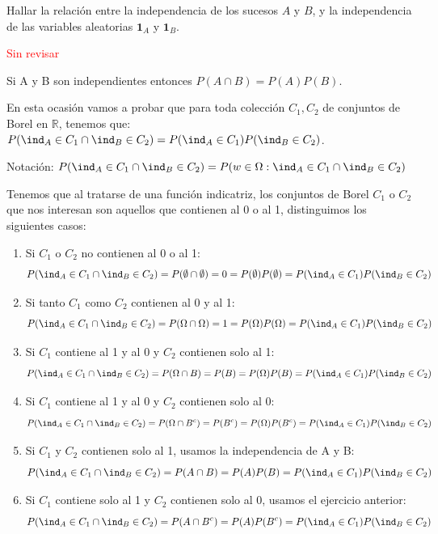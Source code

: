 \begin{problem}[2] Hallar la relaci\'on entre la independencia de los sucesos $A$ y $B$, y la independencia de las variables aleatorias $\mathbf{1}_A$ y $\mathbf{1}_B$.

\solution

\textcolor{red}{Sin revisar}

Si A y B son independientes entonces $P(A \cap B) = P(A)P(B)$.

En esta ocasión vamos a probar que para toda colección $C_1,C_2$ de conjuntos de Borel en $\mathbb{R}$, tenemos que: $P(\ind_A \in C_1 \cap \ind_B \in C_2)=P(\ind_A \in C_1)P(\ind_B \in C_2)$. 

Notación: $P(\ind_A \in C_1 \cap \ind_B \in C_2) = P(w \in \Omega : \ind_A \in C_1 \cap \ind_B \in C_2)$

Tenemos que al tratarse de una función indicatriz, los conjuntos de Borel $C_1$ o $C_2$ que nos interesan son aquellos que contienen al 0 o al 1, distinguimos los siguientes casos:

\begin{enumerate}
\item Si $C_1$ o $C_2$ no contienen al 0 o al 1:
\[
P(\ind_A \in C_1 \cap \ind_B \in C_2) = P(\emptyset \cap \emptyset) = 0 = P(\emptyset) P(\emptyset) =P(\ind_A \in C_1)P(\ind_B \in C_2)
\]

\item Si tanto $C_1$ como $C_2$ contienen al 0 y al 1:
\[
P(\ind_A \in C_1 \cap \ind_B \in C_2) = P(\Omega \cap \Omega) = 1 = P(\Omega) P(\Omega) = P(\ind_A \in C_1)P(\ind_B \in C_2)
\]

\item Si $C_1$ contiene al 1 y al 0 y $C_2$ contienen solo al 1:
\[
P(\ind_A \in C_1 \cap \ind_B \in C_2) = P(\Omega \cap B) = P(B) = P(\Omega) P(B) = P(\ind_A \in C_1)P(\ind_B \in C_2)
\]


\item Si $C_1$ contiene al 1 y al 0 y $C_2$ contienen solo al 0:
\[
P(\ind_A \in C_1 \cap \ind_B \in C_2) = P(\Omega \cap B^c) = P(B^c) = P(\Omega) P(B^c) = P(\ind_A \in C_1)P(\ind_B \in C_2)
\]

\item Si $C_1$ y $C_2$ contienen solo al 1, usamos la independencia de A y B:
\[
P(\ind_A \in C_1 \cap \ind_B \in C_2) = P(A \cap B) = P(A)P(B) = P(\ind_A \in C_1)P(\ind_B \in C_2)
\]

\item Si $C_1$ contiene solo al 1 y $C_2$ contienen solo al 0, usamos el ejercicio anterior:
\[
P(\ind_A \in C_1 \cap \ind_B \in C_2) = P(A \cap B^c) = P(A)P(B^c) = P(\ind_A \in C_1)P(\ind_B \in C_2)
\]


\end{enumerate}
\end{problem}
